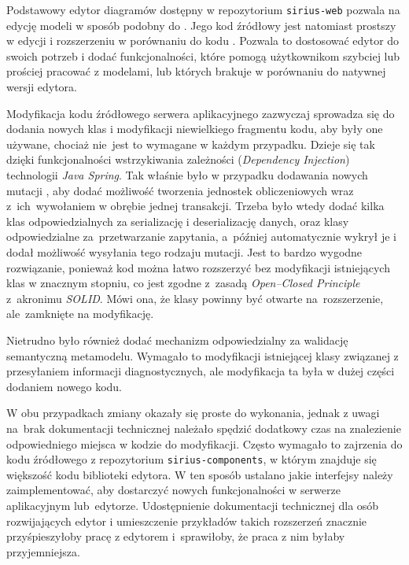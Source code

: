 Podstawowy edytor diagramów dostępny w repozytorium \texttt{sirius-web}
pozwala na edycję modeli w sposób podobny do \SiriusDesktop{}.
Jego kod źródłowy jest natomiast prostszy w edycji i rozszerzeniu w porównaniu
do kodu \SiriusDesktop{}. Pozwala to dostosować edytor do swoich potrzeb i
dodać funkcjonalności, które pomogą użytkownikom szybciej lub prościej pracować
z modelami, lub których brakuje w porównaniu do natywnej wersji edytora.

Modyfikacja kodu źródłowego serwera aplikacyjnego zazwyczaj sprowadza się do
dodania nowych klas i modyfikacji niewielkiego fragmentu kodu, aby były one
używane, chociaż nie~jest to wymagane w każdym przypadku. Dzieje się tak dzięki
funkcjonalności wstrzykiwania zależności (\emph{Dependency Injection})
technologii \emph{Java Spring}. Tak właśnie było w przypadku dodawania nowych
mutacji \GraphQL{}, aby dodać możliwość tworzenia jednostek obliczeniowych
wraz z~ich~wywołaniem w obrębie jednej transakcji. Trzeba było wtedy
dodać kilka klas odpowiedzialnych za serializację i deserializację danych, oraz
klasy odpowiedzialne za~przetwarzanie zapytania, a~później \SiriusWeb{}
automatycznie wykrył je i dodał możliwość wysyłania tego rodzaju mutacji.
Jest to bardzo wygodne rozwiązanie, ponieważ kod można łatwo rozszerzyć bez
modyfikacji istniejących klas w znacznym stopniu, co jest zgodne z~zasadą
\emph{Open--Closed Principle} %
z~akronimu \emph{SOLID}. Mówi ona, że klasy powinny być otwarte
na~rozszerzenie, ale~zamknięte na modyfikację.

Nietrudno było również dodać mechanizm odpowiedzialny za walidację semantyczną
metamodelu. Wymagało to modyfikacji istniejącej klasy związanej z przesyłaniem
informacji diagnostycznych, ale modyfikacja ta była w dużej części dodaniem
nowego kodu.

W obu przypadkach zmiany okazały się proste do wykonania, jednak z uwagi
na~brak dokumentacji technicznej \SiriusWeb{} należało spędzić dodatkowy czas
na znalezienie odpowiedniego miejsca w kodzie do modyfikacji. Często wymagało
to zajrzenia do kodu źródłowego z repozytorium \texttt{sirius-components}, w
którym znajduje się większość kodu biblioteki edytora. W ten sposób ustalano
jakie interfejsy należy
zaimplementować, aby dostarczyć nowych funkcjonalności w serwerze aplikacyjnym
lub~edytorze. Udostępnienie dokumentacji technicznej \SiriusWeb{} dla osób
rozwijających edytor i umieszczenie przykładów takich rozszerzeń znacznie
przyśpieszyłoby pracę z edytorem i~sprawiłoby, że praca z nim byłaby
przyjemniejsza.


